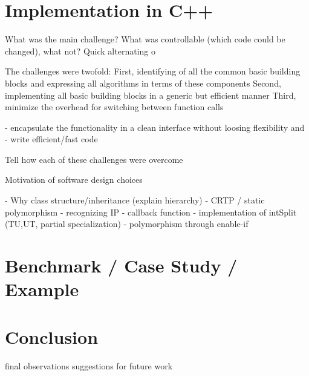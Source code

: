 \clearpage
\section{Implementation in C++}

\cite{libwaveblocks}
What was the main challenge? What was controllable (which code could be changed), what not? 
Quick alternating o

The challenges were twofold: 
First, identifying of all the common basic building blocks and expressing all algorithms in terms of these components
Second, implementing all basic building blocks in a generic but efficient manner
Third, minimize the overhead for switching between function calls

 - encapsulate the functionality in a clean interface without loosing flexibility and 
 - write efficient/fast code

Tell how each of these challenges were overcome


Motivation of software design choices

	- Why class structure/inheritance (explain hierarchy)
	- CRTP / static polymorphism \cite{C_CRTP}
	- recognizing IP
	- callback function
	- implementation of intSplit (TU,UT, partial specialization)
	- polymorphism through enable-if




\clearpage
\section{Benchmark / Case Study / Example}


\clearpage
\section{Conclusion}

final observations
suggestions for future work













































\clearemptydoublepage

\appendix
% 
% 
% 

\clearemptydoublepage





